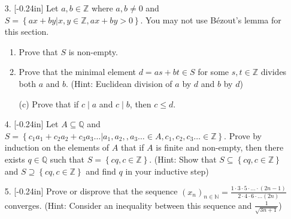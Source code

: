\documentclass[letterpaper,12pt]{article}
\newcommand{\set}[1]{\left\{ #1 \right\}}
\theoremstyle{definition}
\begin{document}
\pagebreak
\begin{enumerate}
    \item[3. ]\reversemarginpar{}[-0.24in] Let $a,b \in \mathbb{Z}$ where $a,b \neq 0$ and $S = \set{ax + by | x,y \in \mathbb{Z}, ax + by > 0}$. You may not use Bézout's lemma for this section. \begin{enumerate}
        \item Prove that $S$ is non-empty. 
            \vspace{1.1in}
        \item Prove that the minimal element $d = as + bt \in S$ for some $s,t \in \mathbb{Z}$ divides both $a$ and $b$. (Hint: Euclidean division of $a$ by $d$ and $b$ by $d$)
    \end{enumerate}
\end{enumerate}
\pagebreak
\begin{enumerate}
    \item[] \begin{enumerate}
        \item[(c)] Prove that if $c \mid a$ and $c \mid b$, then $c \leq d$.
    \end{enumerate}
\end{enumerate}
\pagebreak
\begin{enumerate}
    \item[4.]\reversemarginpar{}[-0.24in] 
  Let $A\subseteq \mathbb{Q}$ and $S = \set{c_1a_1 + c_2a_2 + c_3a_3 \ldots | a_1,a_2,,a_3\ldots \in A, c_1,c_2,c_3 \ldots \in \mathbb{Z}}$. Prove by induction on the elements of $A$ that if $A$ is finite and non-empty, then there exists $q \in \mathbb{Q}$ such that $S = \set{cq, c \in \mathbb{Z}}$. (Hint: Show that $S \subseteq \set{cq, c \in \mathbb{Z}}$ and $S \supseteq \set{cq, c \in \mathbb{Z}}$ and find $q$ in your inductive step)
\end{enumerate}
\pagebreak
\begin{enumerate}
    \item[5.] \reversemarginpar{}[-0.24in] Prove or disprove that the sequence $(x_n)_{n \in \mathbb{N}} = \frac{1\cdot 3 \cdot 5 \cdot \ldots \cdot (2n-1)}{2 \cdot 4 \cdot 6 \cdot \ldots (2n)}$ converges. (Hint: Consider an inequality between this sequence and $\frac{1}{\sqrt{3n+1}}$)
\end{enumerate}
\end{document}
